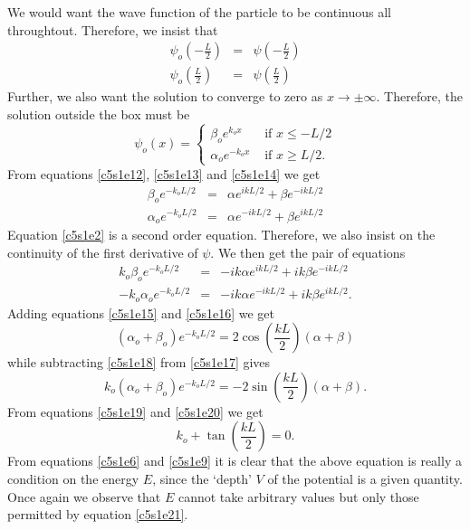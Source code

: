 We would want the wave function of the particle to be continuous all 
throughtout. Therefore, we insist that
\begin{eqnarray}
\psi_o\left(-\frac{L}{2}\right) &=& \psi\left(-\frac{L}{2}\right) 
  \label{c5s1e12} \\
\psi_o\left(\frac{L}{2}\right) &=& \psi\left(\frac{L}{2}\right) 
  \label{c5s1e13} 
\end{eqnarray}
Further, we also want the solution to converge to zero as $x \rightarrow \pm
\infty$. Therefore, the solution outside the box must be
\begin{equation}\label{c5s1e14}
\psi_o(x) = \begin{cases}
\beta_o e^{k_ox} & \text{ if } x \le -L/2 \\
\alpha_o e^{-k_ox} & \text{ if } x \ge L/2.
\end{cases}
\end{equation}
From equations \eqref{c5s1e12}, \eqref{c5s1e13} and \eqref{c5s1e14} we get
\begin{eqnarray}
\beta_o e^{-k_oL/2} &=& \alpha e^{ikL/2} + \beta e^{-ikL/2} \label{c5s1e15} \\
\alpha_o e^{-k_oL/2} &=& \alpha e^{-ikL/2} + \beta e^{ikL/2} \label{c5s1e16}
\end{eqnarray}
Equation \eqref{c5s1e2} is a second order equation. Therefore, we also insist
on the continuity of the first derivative of $\psi$. We then get the pair of
equations
\begin{eqnarray}
k_o\beta_o e^{-k_oL/2} &=& -ik\alpha e^{ikL/2} + ik\beta e^{-ikL/2} 
   \label{c5s1e17} \\
-k_o\alpha_o e^{-k_oL/2} &=& -ik\alpha e^{-ikL/2} + ik\beta e^{ikL/2}.
   \label{c5s1e18}
\end{eqnarray}
Adding equations \eqref{c5s1e15} and \eqref{c5s1e16} we get
\begin{equation}\label{c5s1e19}
(\alpha_o + \beta_o)e^{-k_oL/2} = 2\cos\left(\frac{kL}{2}\right)(\alpha + \beta)
\end{equation}
while subtracting \eqref{c5s1e18} from \eqref{c5s1e17} gives
\begin{equation}\label{c5s1e20}
k_o(\alpha_o + \beta_o)e^{-k_oL/2} = -2\sin\left(\frac{kL}{2}\right)(\alpha +
\beta).
\end{equation}
From equations \eqref{c5s1e19} and \eqref{c5s1e20} we get
\begin{equation}\label{c5s1e21}
k_o + \tan\left(\frac{kL}{2}\right) = 0.
\end{equation}
From equations \eqref{c5s1e6} and \eqref{c5s1e9} it is clear that the above
equation is really a condition on the energy $E$, since the `depth' $V$ of the
potential is a given quantity. Once again we observe that $E$ cannot take 
arbitrary values but only those permitted by equation \eqref{c5s1e21}.

